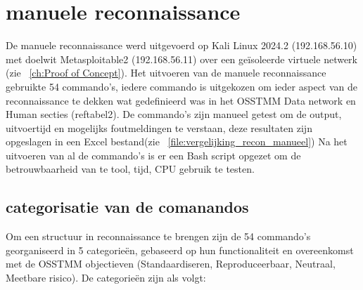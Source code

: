\section{manuele reconnaissance}
De manuele reconnaissance werd uitgevoerd op Kali Linux 2024.2 (192.168.56.10) met doelwit Metasploitable2 (192.168.56.11) over een geïsoleerde virtuele netwerk (zie ~\ref{ch:Proof of Concept}).
Het uitvoeren van de manuele reconnaissance gebruikte 54 commando's, iedere commando is uitgekozen om ieder aspect van de reconnaissance te dekken wat gedefinieerd was in het OSSTMM Data network en Human secties (ref{tabel2}).
De commando's zijn manueel getest om de output, uitvoertijd en mogelijks foutmeldingen te verstaan, deze resultaten zijn opgeslagen in een Excel bestand(zie ~\ref{file:vergelijking_recon_manueel})
Na het uitvoeren van al de commando's is er een Bash script opgezet om de betrouwbaarheid van te tool, tijd, CPU gebruik te testen.

\subsection{categorisatie van de comanandos}

Om een structuur in reconnaissance te brengen zijn de 54 commando's georganiseerd in 5 categorieën, gebaseerd op hun functionaliteit en overeenkomst met de OSSTMM objectieven (Standaardiseren, Reproduceerbaar, Neutraal, Meetbare risico).
De categorieën zijn als volgt:

